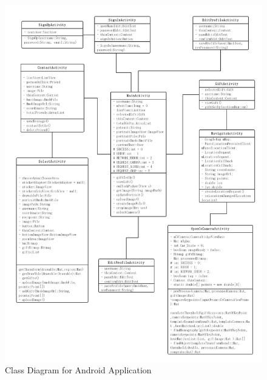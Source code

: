 \begin{figure}[htb]
\centering
\includegraphics[width=.9\textwidth]{section03/assets/AndroidClassDiagram.png}
\caption[Class Diagram for Android Application]{\label{AndroidClassDiagram}Class Diagram for Android Application}
\end{figure}


